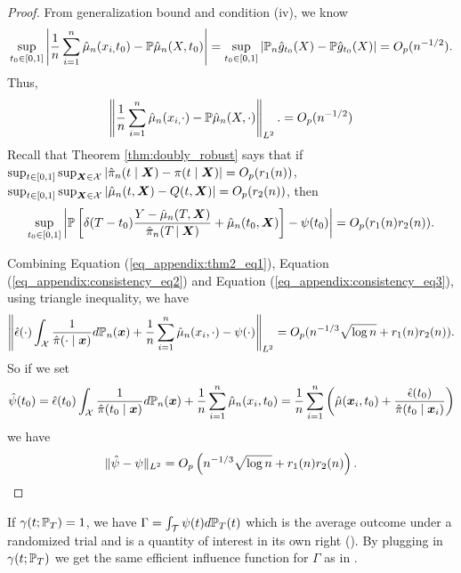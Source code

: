 \begin{proof}
From generalization bound and condition (iv), we know
\begin{equation*}
    \sup_{t_0\in[0,1]}\left|\frac{1}{n}\sum_{i=1}^{n}\hat \mu_n(x_{i,}t_0)-\P \hat \mu_n(X,t_0)\right|
    =\sup_{t_0\in[0,1]}|\P_n\hat g_{t_0}(X)-\P \hat g_{t_0}(X)|
    =\O_p(n^{-1/2}).
\end{equation*}
Thus,
\begin{equation}\label{eq_appendix:consistency_eq2}
\left\|\frac{1}{n}\sum_{i=1}^{n}\hat \mu_n(x_{i,}\cdot)-\P \hat \mu_n(X,\cdot)\right\|_{L^2}. 
=\O_p(n^{-1/2})
\end{equation}
Recall that Theorem \ref{thm:doubly_robust} says that if $\sup_{t\in[0,1]}\sup_{\X\in\mathcal{X}}|\hat\pi_n(t\mid\X)-\pi(t\mid\X)|=\O_p(r_1(n))$, $\sup_{t\in[0,1]}\sup_{\X\in\mathcal{X}}|\hat\mu_n(t,\X)-Q(t,\X)|=\O_p(r_2(n))$, then
\begin{equation}\label{eq_appendix:consistency_eq3}
    \sup_{t_0\in[0,1]}\left|\P \left[\delta(T-t_0)\frac{Y-\hat\mu_n(T,\X)}{\hat\pi_n(T\C\X)}+\hat\mu_n(t_0,\X)\right]-\psi(t_0)\right|=\O_p(r_1(n)r_2(n)).
\end{equation}

Combining Equation (\ref{eq_appendix:thm2_eq1}), Equation (\ref{eq_appendix:consistency_eq2}) and Equation (\ref{eq_appendix:consistency_eq3}), using triangle inequality, we have
$$
\left\|\hat\epsilon(\cdot)\int_{\mathcal{X}}\frac{1}{\hat\pi(\cdot\mid\x)}d\P_n(\x)+\frac{1}{n}\sum_{i=1}^{n}\hat \mu_n(x_i,\cdot)-\psi(\cdot)\right\|_{L^2}
=\O_p(n^{-1/3}\sqrt{\log n}+r_1(n)r_2(n)).
$$
So if we set 
\begin{equation*}
\begin{split}
        \hat\psi(t_0)
        =\hat\epsilon(t_0)\int_{\mathcal{X}}\frac{1}{\hat\pi(t_0\mid\x)}d\P_n(\x)+\frac{1}{n}\sum_{i=1}^{n}\hat \mu_n(x_i,t_0)
=\frac{1}{n}\sum_{i=1}^{n}\left(\hat \mu(\x_i,t_0)+ \frac{\hat\epsilon(t_0)}{\hat\pi(t_0\mid\x_i)}\right)
\end{split}
\end{equation*}
we have
$$
\|\hat\psi-\psi\|_{L^2}=\O_p\left(n^{-1/3}\sqrt{\log n}+r_1(n)r_2(n)\right).
$$
\end{proof}

\iffalse
\begin{corollary}\label{corollary:EIF_integrated}
If $\gamma(t;\P_T)=1$, we have $\Gamma=\int_{\mathcal{T}}\psi(t)d\P_T(t)$ which is the average outcome under a randomized trial and is a quantity of interest in its own right (\cite{kennedy2017non}). By plugging in $\gamma(t;\P_T)$ we get the same efficient influence function for $\Gamma$ as in \cite{kennedy2017non}. 
\end{corollary}

